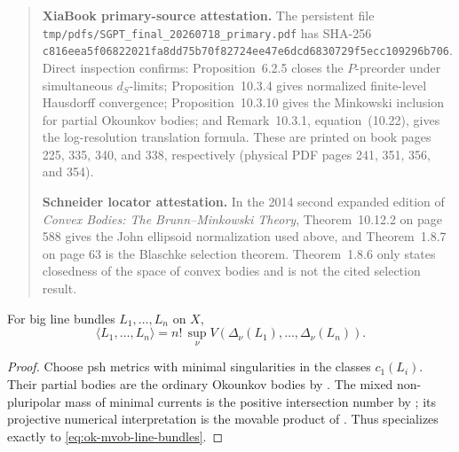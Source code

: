 \begin{quote}
\textbf{XiaBook primary-source attestation.}
The persistent file \texttt{tmp/pdfs/SGPT\_final\_20260718\_primary.pdf}
has SHA-256
\texttt{c816eea5f06822021fa8dd75b70f82724ee47e6dcd6830729f5ecc109296b706}.
Direct inspection confirms: Proposition~6.2.5 closes the \(P\)-preorder
under simultaneous \(d_S\)-limits; Proposition~10.3.4 gives normalized
finite-level Hausdorff convergence; Proposition~10.3.10 gives the
Minkowski inclusion for partial Okounkov bodies; and Remark~10.3.1,
equation~(10.22), gives the log-resolution translation formula.
These are printed on book pages 225, 335, 340, and 338, respectively
(physical PDF pages 241, 351, 356, and 354).

\textbf{Schneider locator attestation.}
In the 2014 second expanded edition of \emph{Convex Bodies: The
Brunn--Minkowski Theory}, Theorem~10.12.2 on page 588 gives the John
ellipsoid normalization used above, and Theorem~1.8.7 on page 63 is the
Blaschke selection theorem.  Theorem~1.8.6 only states closedness of the
space of convex bodies and is not the cited selection result.
\end{quote}

\begin{theorem}\label{thm:ok-mvob-line-bundles}
For big line bundles \(L_1,\ldots,L_n\) on \(X\),
\[
 \langle L_1,\dots,L_n\rangle
 =n!\,\sup_\nu V\!\left(
     \Delta_\nu(L_1),\dots,\Delta_\nu(L_n)\right).
\tag{55.49}\label{eq:ok-mvob-line-bundles}
\]
\end{theorem}

\begin{proof}
Choose psh metrics with minimal singularities in the classes \(c_1(L_i)\).
Their partial bodies are the ordinary Okounkov bodies by
.  The mixed non-pluripolar mass of
minimal currents is the positive intersection number by
\cite[Definition~1.17]{BEGZ10}; its projective numerical interpretation is
the movable product of \cite[Propositions~2.12--2.13]{BFJ09}.
Thus  specializes exactly to
\eqref{eq:ok-mvob-line-bundles}.
\end{proof}
